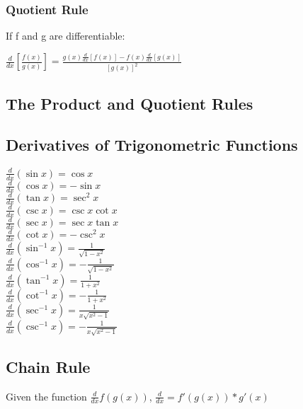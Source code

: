 \documentclass[10pt,a4paper]{article}
\begin{document}
		\subsubsection{Quotient Rule}
		If f and g are differentiable:
		\begin{center}
			$\frac{d}{dx}[\frac{f(x)}{g(x)}] = \frac{g(x)\frac{d}{dx}[f(x)]-f(x)\frac{d}{dx}[g(x)]}{[g(x)]^{2}}$
		\end{center}
		\subsection{The Product and Quotient Rules}
		\subsection{Derivatives of Trigonometric Functions}
			$\frac{d}{dx}(\sin{x}) = \cos{x}$
		\\	$\frac{d}{dx}(\cos{x}) = -\sin{x}$
		\\	$\frac{d}{dx}(\tan{x}) = \sec^{2}{x}$
		\\	$\frac{d}{dx}(\csc{x}) = \csc{x}\cot{x}$
		\\	$\frac{d}{dx}(\sec{x})= \sec{x}\tan{x}$
		\\	$\frac{d}{dx}(\cot{x}) = -\csc^{2}{x}$
		\\	$\frac{d}{dx}(\sin^{-1}{x}) = \frac{1}{\sqrt{1-x^{2}}}$
		\\	$\frac{d}{dx}(\cos^{-1}{x}) = -\frac{1}{\sqrt{1-x^{2}}}$
		\\	$\frac{d}{dx}(\tan^{-1}{x}) = \frac{1}{1+x^{2}}$
		\\ $\frac{d}{dx}(\cot^{-1}{x}) = -\frac{1}{1+x^{2}}$
		\\ $\frac{d}{dx}(\sec^{-1}{x}) = \frac{1}{x\sqrt{x^{2}-1}}$
		\\ $\frac{d}{dx}(\csc^{-1}{x}) = -\frac{1}{x\sqrt{x^{2}-1}}$

	
	\subsection{Chain Rule}
		Given the function $\frac{d}{dx}f(g(x))$, $ \frac{d}{dx} = f'(g(x))*g'(x)$
\end{document}
